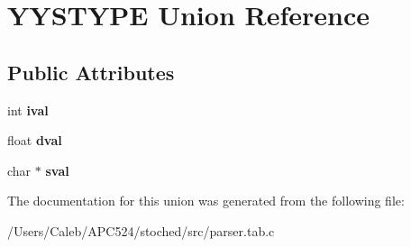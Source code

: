 \hypertarget{union_y_y_s_t_y_p_e}{}\section{Y\+Y\+S\+T\+Y\+PE Union Reference}
\label{union_y_y_s_t_y_p_e}
\subsection*{Public Attributes}
\begin{DoxyCompactItemize}
\item 
\mbox{\label{union_y_y_s_t_y_p_e_ae9d3f6cba410d8f367f34437acf8c9a2}} 
int {\bfseries ival}
\item 
\mbox{\label{union_y_y_s_t_y_p_e_aaa559352973b642b18a80a71033affe6}} 
float {\bfseries dval}
\item 
\mbox{\label{union_y_y_s_t_y_p_e_ab660933e53766ba3914f0d60ed01f6e4}} 
char $\ast$ {\bfseries sval}
\end{DoxyCompactItemize}


The documentation for this union was generated from the following file\+:\begin{DoxyCompactItemize}
\item 
/\+Users/\+Caleb/\+A\+P\+C524/stoched/src/parser.\+tab.\+c\end{DoxyCompactItemize}

